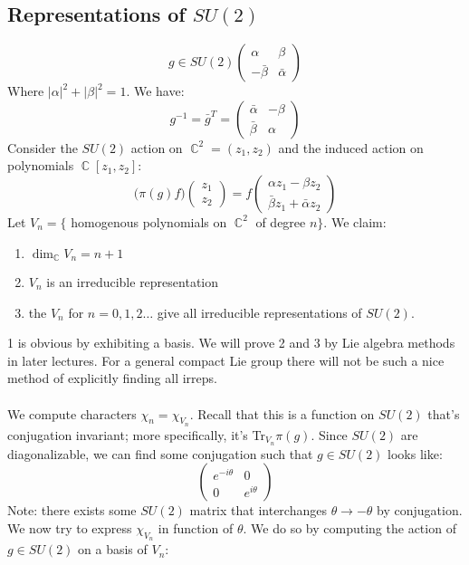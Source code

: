 \documentclass[12 pt]{article}
\DeclareMathOperator {\C} {\mathbb{C}}
\theoremstyle{plain}
\theoremstyle{definition}
\theoremstyle{remark}
\begin{document}
\subsection*{Representations of $SU(2)$}
\[     g \in SU(2)  \left(   \begin{array} {cc}  \alpha & \beta \\ - \bar \beta & \bar \alpha \end{array} \right)     \]
Where $|\alpha|^2 + |\beta|^2 = 1$. We have:
\[       g^{-1} = \bar g^T =   \left(   \begin{array} {cc}  \bar\alpha & - \beta \\  \bar \beta & \alpha \end{array} \right)    \]
Consider the $SU(2)$ action on $\C^2 = (z_1, z_2)$ and the induced action on polynomials $\C[z_1, z_2]$:
\[        \big( \pi(g) f \big)  \left(  \begin{array} {c} z_1 \\ z_2  \end{array} \right)   = f \left(  \begin{array} {c} \alpha z_1 - \beta z_2 \\  \bar \beta z_1 + \bar \alpha z_2  \end{array} \right)   \]
Let $V_n = \{$ homogenous polynomials on $\C^2$ of degree $n \}$. We claim:
\begin{enumerate}
\item $\dim_{\C} V_n = n+1$
\item $V_n$ is an irreducible representation
\item the $V_n$ for $n = 0,1,2 \dots$ give all irreducible representations of $SU(2)$.
\end{enumerate}
1 is obvious by exhibiting a basis. We will prove 2 and 3 by Lie algebra methods in later lectures. For a general compact Lie group there will not be such a nice method of explicitly finding all irreps.
\\
\\
We compute characters $\chi_n = \chi_{V_n}$. Recall that this is a function on $SU(2)$ that's conjugation invariant; more specifically, it's Tr$_{V_n} \pi(g)$. Since $SU(2)$ are diagonalizable, we can find some conjugation such that $g\in SU(2)$ looks like:
\[      \left(   \begin{array} {cc}  e^{-i\theta} & 0 \\ 0 & e^{i\theta} \end{array} \right)      \]
Note: there exists some $SU(2)$ matrix that interchanges $\theta \to - \theta$ by conjugation. We now try to express $\chi_{V_n}$ in function of $\theta$. We do so by computing the action of $g \in SU(2)$ on a basis of $V_n$:
\end{document}
